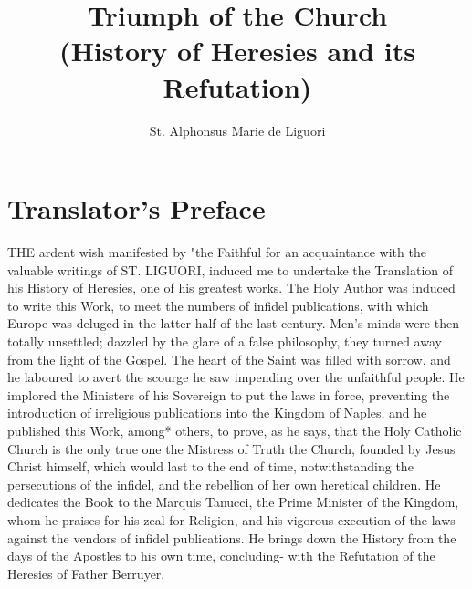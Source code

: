 \documentclass[12pt]{book}
\begin{document}
\title{Triumph of the Church\\(History of Heresies and its Refutation)}
\author{St. Alphonsus Marie de Liguori}
\date{}
\maketitle
{}

\chapter*{Translator's Preface}
THE ardent wish manifested by "the Faithful for an acquaintance with the valuable writings of ST. 
LIGUORI, induced me to undertake the Translation of his History of Heresies, one of his greatest works.
The Holy Author was induced to write this Work, to meet the numbers of infidel publications, with
which Europe was deluged in the latter half of the last century. Men’s minds were then totally unsettled;
dazzled by the glare of a false philosophy, they turned away from the light of the Gospel. The heart of the
Saint was filled with sorrow, and he laboured to avert the scourge he saw impending over the unfaithful
people. He implored the Ministers of his Sovereign to put the laws in force, preventing the introduction
of irreligious publications into the Kingdom of Naples, and he published this Work, among* others, to
prove, as he says, that the Holy Catholic Church is the only true one the Mistress of Truth the Church,
founded by Jesus Christ himself, which would last to the end of time, notwithstanding the persecutions
of the infidel, and the rebellion of her own heretical children. He dedicates the Book to the Marquis
Tanucci, the Prime Minister of the Kingdom, whom he praises for his zeal for Religion, and his vigorous
execution of the laws against the vendors of infidel publications. He brings down the History from the
days of the Apostles to his own time, concluding- with the Refutation of the Heresies of Father Berruyer.
\end{document}
